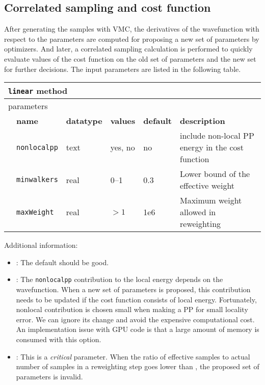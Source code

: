 \subsection{Correlated sampling and cost function}
After generating the samples with VMC, the derivatives of the wavefunction with respect to the parameters are computed for proposing a new set of parameters by optimizers.
And later, a correlated sampling calculation is performed to quickly evaluate values of the cost function on the old set of parameters and the new set for further decisions.
The input parameters are listed in the following table.
\begin{table}[h]
\begin{center}
\begin{tabularx}{\textwidth}{l l l l l X }
\hline
\multicolumn{6}{l}{\texttt{linear} method} \\
\hline
\multicolumn{2}{l}{parameters}  & \multicolumn{4}{l}{}\\
   &   \bfseries name     & \bfseries datatype & \bfseries values & \bfseries default   & \bfseries description \\
   &   \texttt{nonlocalpp} &  text     & yes, no & no  & include non-local PP energy in the cost function\\
   &   \texttt{minwalkers} &  real     & 0--1   & 0.3 & Lower bound of the effective weight\\
   &   \texttt{maxWeight} &  real     & $>1$   & 1e6 & Maximum weight allowed in reweighting\\
  \hline
\end{tabularx}
\end{center}
\end{table}

Additional information:
\begin{itemize}
\item {}: The default should be good.
\item {}: The \texttt{nonlocalpp} contribution to the local energy depends on the wavefunction.
When a new set of parameters is proposed, this contribution needs to be updated if the cost function consists of local energy.
Fortunately, nonlocal contribution is chosen small when making a PP for small locality error.
We can ignore its change and avoid the expensive computational cost.
An implementation issue with GPU code is that a large amount of memory is consumed with this option.
\item {}: This is a \textit{critical} parameter. When the ratio of effective samples to actual number of samples in a reweighting step goes lower than ,
the proposed set of parameters is invalid. %
\end{itemize}

